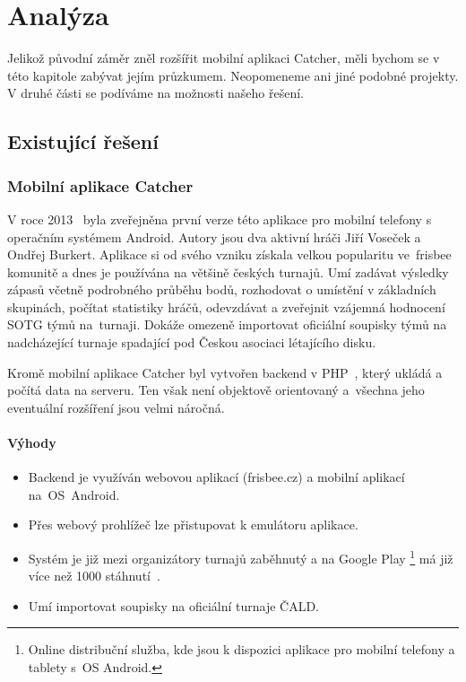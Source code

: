 \chapter{Analýza}

Jelikož původní záměr zněl rozšířit mobilní aplikaci Catcher,
měli bychom se v této kapitole zabývat jejím průzkumem. Neopomeneme ani jiné podobné projekty.
V druhé části se podíváme na možnosti našeho řešení.

\section{Existující řešení}

\subsection*{Mobilní aplikace Catcher}

V roce 2013~\cite{cald_catcher} byla zveřejněna první verze této aplikace pro mobilní telefony s operačním systémem Android.
Autory jsou dva aktivní hráči Jiří Voseček a Ondřej Burkert. Aplikace si od svého vzniku získala velkou popularitu
ve~frisbee komunitě a dnes je používána na většině českých turnajů. Umí zadávat výsledky
zápasů včetně podrobného průběhu bodů, rozhodovat o umístění v základních skupinách, počítat statistiky hráčů,
odevzdávat a zveřejnit vzájemná hodnocení SOTG týmů na~turnaji. Dokáže omezeně importovat oficiální soupisky týmů
na nadcházející turnaje spadající pod Českou asociaci létajícího disku.

Kromě mobilní aplikace Catcher byl vytvořen backend v PHP~\cite{php}, který ukládá a počítá data na serveru. Ten však není
objektově orientovaný a~všechna jeho eventuální rozšíření jsou velmi náročná.

\subsubsection*{Výhody}
\begin{itemize}
  \item Backend je využíván webovou aplikací (frisbee.cz) a mobilní aplikací na~OS~Android.
  \item Přes webový prohlížeč lze přistupovat k emulátoru aplikace.
  \item Systém je již mezi organizátory turnajů zaběhnutý a na Google Play
    \footnote{Online distribuční služba, kde jsou k dispozici aplikace pro mobilní telefony a tablety s~OS Android.}
    má již více než 1000 stáhnutí~\cite{catcher_play}.
  \item Umí importovat soupisky na oficiální turnaje ČALD.
\end{itemize}

